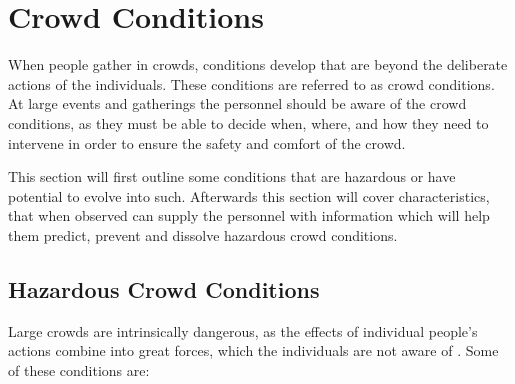 \section{Crowd Conditions}\label{sec:related_work}

When people gather in crowds, conditions develop that are beyond the deliberate actions of the individuals. These conditions are referred to as crowd conditions. At large events and gatherings the personnel should be aware of the crowd conditions, as they must be able to decide when, where, and how they need to intervene in order to ensure the safety and comfort of the crowd.

This section will first outline some conditions that are hazardous or have potential to evolve into such. Afterwards this section will cover characteristics, that when observed can supply the personnel with information which will help them predict, prevent and dissolve hazardous crowd conditions.

\subsection{Hazardous Crowd Conditions}
Large crowds are intrinsically dangerous, as the effects of individual people's actions combine into great forces, which the individuals are not aware of \cite{website:Wikipedia-Hajj}. Some of these conditions are:

